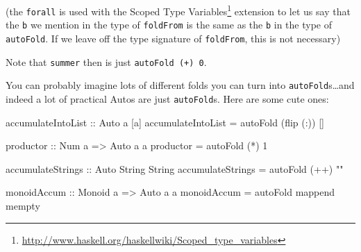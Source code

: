 \documentclass[]{article}
\newenvironment{Shaded}{}{}
\newcommand{\KeywordTok}[1]{\textcolor[rgb]{0.00,0.44,0.13}{\textbf{{#1}}}}
\newcommand{\DataTypeTok}[1]{\textcolor[rgb]{0.56,0.13,0.00}{{#1}}}
\newcommand{\DecValTok}[1]{\textcolor[rgb]{0.25,0.63,0.44}{{#1}}}
\newcommand{\StringTok}[1]{\textcolor[rgb]{0.25,0.44,0.63}{{#1}}}
\newcommand{\OtherTok}[1]{\textcolor[rgb]{0.00,0.44,0.13}{{#1}}}
\newcommand{\FunctionTok}[1]{\textcolor[rgb]{0.02,0.16,0.49}{{#1}}}
\newcommand{\NormalTok}[1]{{#1}}
\renewcommand{\href}[2]{#2\footnote{\url{#1}}}
\begin{document}
\begin{Shaded}
\end{Shaded}

(the \texttt{forall} is used with the
\href{http://www.haskell.org/haskellwiki/Scoped_type_variables}{Scoped
Type Variables} extension to let us say that the \texttt{b} we mention
in the type of \texttt{foldFrom} is the same as the \texttt{b} in the
type of \texttt{autoFold}. If we leave off the type signature of
\texttt{foldFrom}, this is not necessary)

Note that \texttt{summer} then is just \texttt{autoFold\ (+)\ 0}.

You can probably imagine lots of different folds you can turn into
\texttt{autoFold}s\ldots{}and indeed a lot of practical Autos are just
\texttt{autoFold}s. Here are some cute ones:

\begin{Shaded}
\begin{Highlighting}[]
\OtherTok{accumulateIntoList ::} \DataTypeTok{Auto} \NormalTok{a [a]}
\NormalTok{accumulateIntoList }\FunctionTok{=} \NormalTok{autoFold (flip (}\FunctionTok{:}\NormalTok{)) []}

\OtherTok{productor ::} \DataTypeTok{Num} \NormalTok{a }\OtherTok{=>} \DataTypeTok{Auto} \NormalTok{a a}
\NormalTok{productor }\FunctionTok{=} \NormalTok{autoFold (}\FunctionTok{*}\NormalTok{) }\DecValTok{1}

\OtherTok{accumulateStrings ::} \DataTypeTok{Auto} \DataTypeTok{String} \DataTypeTok{String}
\NormalTok{accumulateStrings }\FunctionTok{=} \NormalTok{autoFold (}\FunctionTok{++}\NormalTok{) }\StringTok{""}

\OtherTok{monoidAccum ::} \DataTypeTok{Monoid} \NormalTok{a }\OtherTok{=>} \DataTypeTok{Auto} \NormalTok{a a}
\NormalTok{monoidAccum }\FunctionTok{=} \NormalTok{autoFold mappend mempty}
\end{Highlighting}
\end{Shaded}
\end{document}
